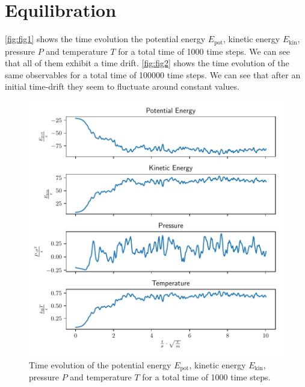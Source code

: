 \documentclass[a4paper,10pt,bibtotoc]{scrartcl}
\begin{document}
\section{Equilibration}
\autoref{fig:fig1} shows the time evolution the potential energy $E_\mathrm{pot}$, kinetic energy $E_\mathrm{kin}$, pressure $P$ and temperature $T$ for a total time of 1000 time steps.
We can see that all of them exhibit a time drift. 
\autoref{fig:fig2} shows the time evolution of the same observables for a total time of 100000 time steps.
We can see that after an initial time-drift they seem to fluctuate around constant values.
\begin{figure}[H]
        \centering
        \includegraphics[width=\linewidth]{Figure_1.pdf}
    \caption{Time evolution of the potential energy $E_\mathrm{pot}$, kinetic energy $E_\mathrm{kin}$, pressure $P$ and temperature $T$ for a total time of 1000 time steps.}
    \label{fig:fig1}
\end{figure}
\end{document}
